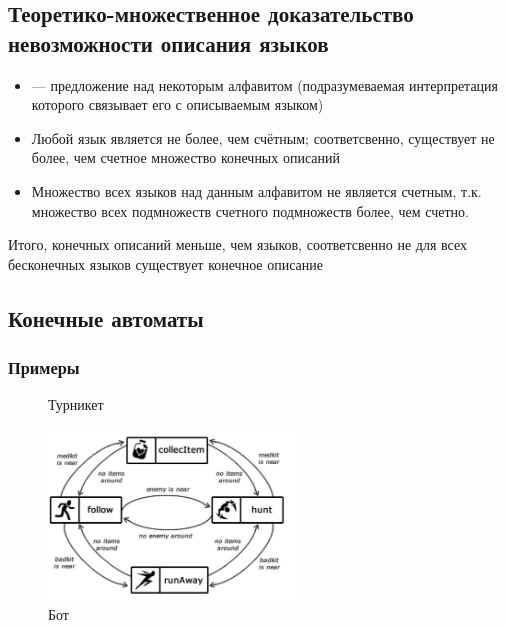 \documentclass[a4paper, 14pt]{extarticle}
\begin{document}
\subsection{Теоретико-множественное доказательство невозможности описания языков}
\begin{itemize}
    \item {} --- предложение над некоторым алфавитом (подразумеваемая интерпретация которого связывает его с описываемым языком)

    \item Любой язык является не более, чем счётным; соответсвенно, существует не более, чем счетное множество конечных описаний

    \item Множество всех языков над данным алфавитом не является счетным, т.к. множество всех подмножеств счетного подмножеств более, чем счетно.

\end{itemize}
Итого, конечных описаний меньше, чем языков, соответсвенно не для всех бесконечных языков существует конечное описание

\subsection{Конечные автоматы}
\subsubsection{Примеры}
\begin{figure}[h]
   \centering
   \caption{Турникет}
\end{figure}

\begin{figure}[h]
    \centering
    \includegraphics[width=0.6\textwidth]{./img/L2/S002.jpg}
    \caption{Бот}
\end{figure}
\end{document}
